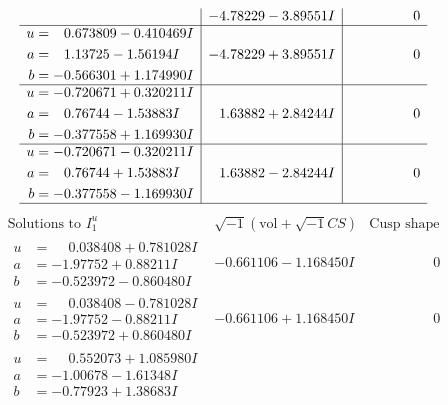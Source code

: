 \documentclass[1p]{elsarticle_modified}
\theoremstyle{definition}
\newcommand{\I}{\sqrt{-1}}
\begin{document}
$$\begin{array}{c|c|c}
 & -4.78229 - 3.89551 I & \phantom{-0.000000 } 0 \\ \hline\begin{aligned}
u &= \phantom{-}0.673809 - 0.410469 I \\
a &= \phantom{-}1.13725 - 1.56194 I \\
b &= -0.566301 + 1.174990 I\end{aligned}
 & -4.78229 + 3.89551 I & \phantom{-0.000000 } 0 \\ \hline\begin{aligned}
u &= -0.720671 + 0.320211 I \\
a &= \phantom{-}0.76744 - 1.53883 I \\
b &= -0.377558 + 1.169930 I\end{aligned}
 & \phantom{-}1.63882 + 2.84244 I & \phantom{-0.000000 } 0 \\ \hline\begin{aligned}
u &= -0.720671 - 0.320211 I \\
a &= \phantom{-}0.76744 + 1.53883 I \\
b &= -0.377558 - 1.169930 I\end{aligned}
 & \phantom{-}1.63882 - 2.84244 I & \phantom{-0.000000 } 0\\
 \hline 
 \end{array}$$\newpage$$\begin{array}{c|c|c}  
\text{Solutions to }I^u_{1}& \I (\text{vol} + \sqrt{-1}CS) & \text{Cusp shape}\\
 \hline 
\begin{aligned}
u &= \phantom{-}0.038408 + 0.781028 I \\
a &= -1.97752 + 0.88211 I \\
b &= -0.523972 - 0.860480 I\end{aligned}
 & -0.661106 - 1.168450 I & \phantom{-0.000000 } 0 \\ \hline\begin{aligned}
u &= \phantom{-}0.038408 - 0.781028 I \\
a &= -1.97752 - 0.88211 I \\
b &= -0.523972 + 0.860480 I\end{aligned}
 & -0.661106 + 1.168450 I & \phantom{-0.000000 } 0 \\ \hline\begin{aligned}
u &= \phantom{-}0.552073 + 1.085980 I \\
a &= -1.00678 - 1.61348 I \\
b &= -0.77923 + 1.38683 I\end{aligned}

\end{array}$$
\end{document}
